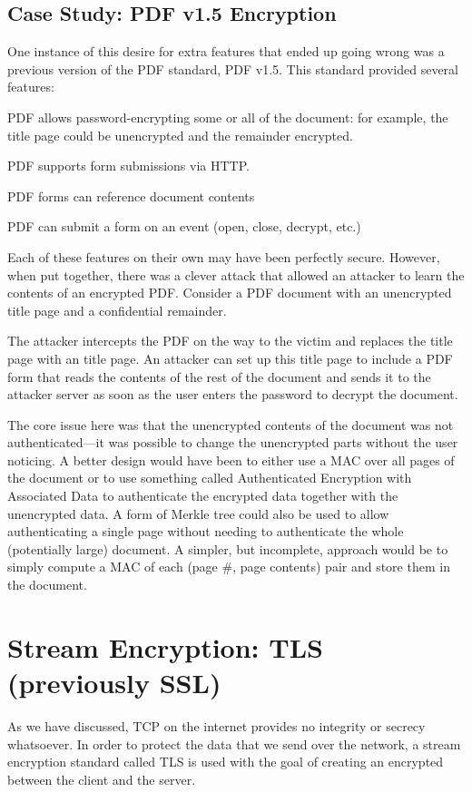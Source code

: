 \subsection{Case Study: PDF v1.5 Encryption}
One instance of this desire for extra features
that ended up going wrong was a previous version
of the PDF standard, PDF v1.5.\cite{muller2019practical} This standard
provided several features:
\begin{compactenum}
	\item PDF allows password-encrypting some or all of the document: for example, the title page could be unencrypted and the remainder encrypted.
	\item PDF supports form submissions via HTTP.
	\item PDF forms can reference document contents
	\item PDF can submit a form on an event (open, close, decrypt, etc.)
\end{compactenum}

Each of these features on their own may have been perfectly secure. However, when put together, there was a clever attack that allowed an attacker to learn the contents of an encrypted PDF. Consider a PDF document with an unencrypted title page and a confidential remainder. 

The attacker intercepts the PDF on the way to the victim and replaces the title page with an  title page. An attacker can set up this title page to include a PDF form that reads the contents of the rest of the document and sends it to the attacker server as soon as the user enters the password to decrypt the document.

The core issue here was that the unencrypted contents of the document was not authenticated---it was possible to change the unencrypted parts without the user noticing. A better design would have been to either use a MAC over all pages of the document or to use something called Authenticated Encryption with Associated Data to authenticate the encrypted data together with the unencrypted data. A form of Merkle tree could also be used to allow authenticating a single page without needing to authenticate the whole (potentially large) document. A simpler, but incomplete, approach would be to simply compute a MAC of each (page \#, page contents) pair and store them in the document.

\section{Stream Encryption: TLS (previously SSL)}
As we have discussed, TCP on the internet provides no integrity or secrecy whatsoever. In order to protect the data that we send over the network, a stream encryption standard called TLS is used with the goal of creating an encrypted  between the client and the server.

